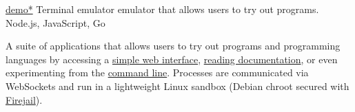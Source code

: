 \showoff
{\textcolor{my-blue}{\href{https://liambeckman.com/code/demo}{demo*}}}
{Terminal emulator emulator that allows users to try out programs.}
{Node.js, JavaScript, Go}
{}

A suite of applications that allows users to try out programs and programming languages by accessing a \textcolor{my-blue}{\href{https://voyager-index.herokuapp.com}{simple web interface}}, \textcolor{my-blue}{\href{https://demo.liambeckman.com/docs-demonstration.html}{reading documentation}}, or even experimenting from the \textcolor{my-blue}{\href{https://github.com/lbeckman314/demo-cli.git}{command line}}. Processes are communicated via WebSockets and run in a lightweight Linux sandbox (Debian chroot secured with \textcolor{my-blue}{\href{https://firejail.wordpress.com/}{Firejail}}).

